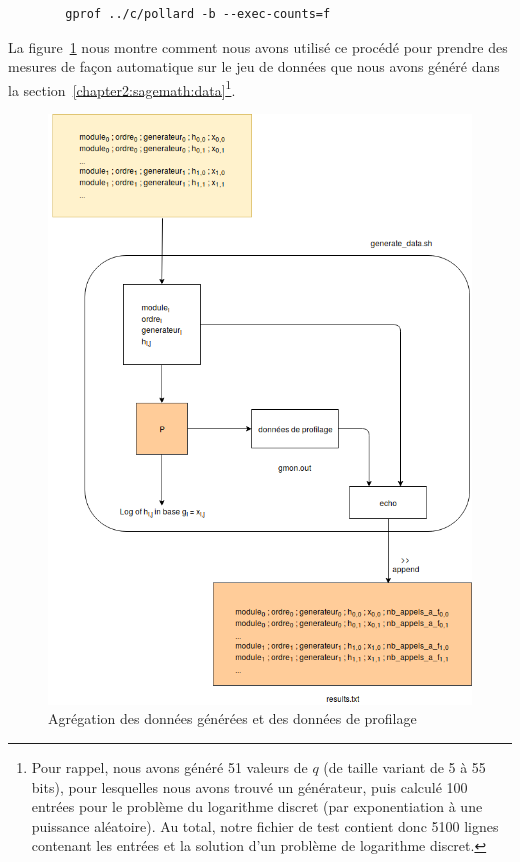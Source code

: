       \begin{lstlisting}
        gprof ../c/pollard -b --exec-counts=f
      \end{lstlisting}

      La figure~\ref{fig:generate_measurement_data} nous montre comment nous avons utilisé ce procédé pour prendre des mesures de façon automatique sur le jeu de données que nous avons généré dans la section~\ref{chapter2:sagemath:data}\footnote{Pour rappel, nous avons généré 51 valeurs de $q$ (de taille variant de 5 à 55 bits), pour lesquelles nous avons trouvé un générateur, puis calculé 100 entrées pour le problème du logarithme discret (par exponentiation à une puissance aléatoire). Au total, notre fichier de test contient donc 5100 lignes contenant les entrées et la solution d'un problème de logarithme discret.}.

      \begin{figure}
        \center{}
        \includegraphics[scale=0.3]{images/generate_measurement_data.png}
        \caption{Agrégation des données générées et des données de profilage}
        \label{fig:generate_measurement_data}
      \end{figure}

